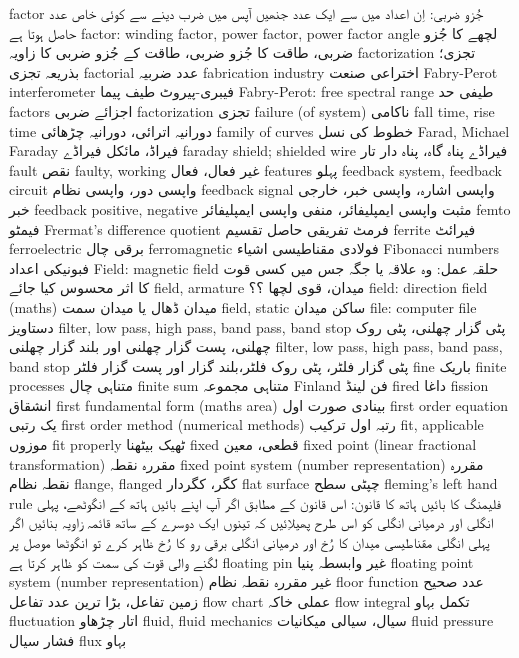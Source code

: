 factor	جُزو ضربی: اِن اعداد میں سے ایک عدد جنھیں آپس میں ضرب دینے سے کوئی خاص عدد حاصل ہوتا ہے
factor: winding factor, power factor, power factor angle	لچھے کا جُزو ضربی، طاقت کا جُزو ضربی، طاقت کے جُزو ضربی کا زاویہ
factorization	تجزی؛ بذریعہ تجزی
factorial	عدد ضربیہ
fabrication industry	اختراعی صنعت
Fabry-Perot interferometer	فیبری-پیروٹ طیف پیما
Fabry-Perot: free spectral range	طیفی حد
factors	اجزائے ضربی
factorization	تجزی
failure (of system)	ناکامی
fall time, rise time	دورانیہ اترائی، دورانیہ چڑھائی
family of curves	خطوط کی نسل
Farad, Michael Faraday	فیراڈ، مائکل فیراڈے
faraday shield; shielded wire	فیراڈے پناہ گاہ، پناہ دار تار
fault	نقص
faulty, working	غیر فعال، فعال
features	پہلو
feedback system, feedback circuit	واپسی دور، واپسی نظام
feedback signal	واپسی اشارہ، واپسی خبر، خارجی خبر
feedback positive, negative	مثبت واپسی ایمپلیفائر، منفی واپسی ایمپلیفائر
femto	فیمٹو
Frermat's difference quotient	فرمٹ تفریقی حاصل تقسیم
ferrite	فیرائٹ
ferroelectric	برقی چال
ferromagnetic	فولادی مقناطیسی اشیاء
Fibonacci numbers	فبونیکی اعداد
Field: magnetic field	حلقہ عمل: وہ علاقہ یا جگہ جس میں کسی قوت کا اثر محسوس کیا جائے
field, armature	میدان، قوی لچھا  ؟؟
field: direction field (maths)	میدان ڈھال یا میدان سمت
field, static	ساکن میدان
file: computer file	دستاویز
filter, low pass, high pass, band pass, band stop	پٹی گزار چھلنی، پٹی روک چھلنی، پست گزار چھلنی اور بلند گزار چھلنی
filter, low pass, high pass, band pass, band stop	پٹی گزار فلٹر، پٹی روک فلٹر،بلند گزار اور پست گزار فلٹر
fine	باریک
finite processes	متناہی چال
finite sum	متناہی مجموعہ
Finland	فن لینڈ
fired	داغا
fission	انشقاق
first fundamental form (maths area)	بینادی صورت اول
first order equation	یک رتبی
first order method (numerical methods)	رتبہ اول ترکیب
fit, applicable	موزوں
fit properly	ٹھیک بیٹھنا
fixed	قطعی، معین
fixed point (linear fractional transformation)	مقررہ نقطہ
fixed point system (number representation)	مقررہ نقطہ نظام
flange, flanged	کگر، کگردار
flat surface	چپٹی سطح
fleming's left hand rule	فلیمنگ کا بائیں ہاتھ کا قانون: اس قانون کے مطابق اگر آپ اپنے بائیں ہاتھ کے انگوٹھے، پہلی انگلی اور درمیانی انگلی کو اس طرح پھیلاِئیں کہ تینوں ایک دوسرے کے ساتھ قائمہ زاویہ بنائیں اگر پہلی انگلی مقناطیسی میدان کا رُخ اور درمیانی انگلی برقی رو کا رُخ ظاہر کرے تو انگوٹھا موصل پر لگنے والی قوت کی سمت کو ظاہر کرتا ہے
floating pin	غیر وابسطہ پنیا
floating point system (number representation)	غیر مقررہ نقطہ نظام
floor function	عدد صحیح زمین تفاعل، بڑا ترین عدد تفاعل
flow chart	عملی خاکہ
flow integral	تکمل بہاو
fluctuation	اتار چڑھاو
fluid, fluid mechanics	سیال، سیالی میکانیات
fluid pressure	فشار سیال
flux	بہاو
